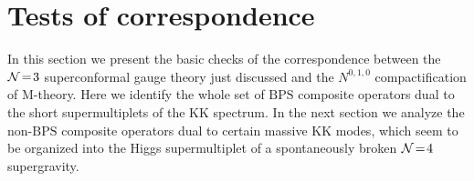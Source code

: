 \documentclass[a4paper,12pt]{article}
\def\n010{N^{0,1,0}}
\begin{document}
\section{Tests of correspondence}\label{comparison}
In this section we present the basic checks of the correspondence
between the ${\cal N}\!=\!3$ superconformal gauge theory just
discussed and the $\n010$ compactification of M-theory.
Here we identify the whole set of $\mathrm{BPS}$ composite operators
dual to the short supermultiplets of the $\mathrm{KK}$ spectrum.
In the next section we analyze the non-$\mathrm{BPS}$ composite operators
dual to certain massive $\mathrm{KK}$ modes, which seem to be organized
into the Higgs supermultiplet of a spontaneously broken ${\cal N}\!=\!4$
supergravity.
\end{document}
